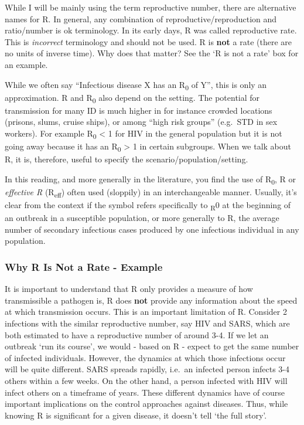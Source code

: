 \documentclass[]{book}
\theoremstyle{definition}
\theoremstyle{definition}
\theoremstyle{definition}
\theoremstyle{remark}
\begin{document}
While I will be mainly using the term reproductive number, there are
alternative names for R. In general, any combination of
reproductive/reproduction and ratio/number is ok terminology. In its
early days, R was called reproductive rate. This is \emph{incorrect}
terminology and should not be used. R is \textbf{not} a rate (there are
no units of inverse time). Why does that matter? See the `R is not a
rate' box for an example.

While we often say ``Infectious disease X has an R\textsubscript{0} of
Y'', this is only an approximation. R and R\textsubscript{0} also depend
on the setting. The potential for transmission for many ID is much
higher in for instance crowded locations (prisons, slums, cruise ships),
or among ``high risk groups'' (e.g.~STD in sex workers). For example
R\textsubscript{0} \textless{} 1 for HIV in the general population but
it is not going away because it has an R\textsubscript{0} \textgreater{}
1 in certain subgroups. When we talk about R, it is, therefore, useful
to specify the scenario/population/setting.

In this reading, and more generally in the literature, you find the use
of R\textsubscript{0}, R or \emph{effective R} (R\textsubscript{eff})
often used (sloppily) in an interchangeable manner. Usually, it's clear
from the context if the symbol refers specifically to \textsubscript{R}0
at the beginning of an outbreak in a susceptible population, or more
generally to R, the average number of secondary infectious cases
produced by one infectious individual in any population.

\subsubsection{Why R Is Not a Rate - Example}\label{myexamplebox}

It is important to understand that R only provides a measure of how
transmissible a pathogen is, R does \textbf{not} provide any information
about the speed at which transmission occurs. This is an important
limitation of R. Consider 2 infections with the similar reproductive
number, say HIV and SARS, which are both estimated to have a
reproductive number of around 3-4. If we let an outbreak `run its
course', we would - based on R - expect to get the same number of
infected individuals. However, the dynamics at which those infections
occur will be quite different. SARS spreads rapidly, i.e.~an infected
person infects 3-4 others within a few weeks. On the other hand, a
person infected with HIV will infect others on a timeframe of years.
These different dynamics have of course important implications on the
control approaches against diseases. Thus, while knowing R is
significant for a given disease, it doesn't tell `the full story'.
\end{document}
